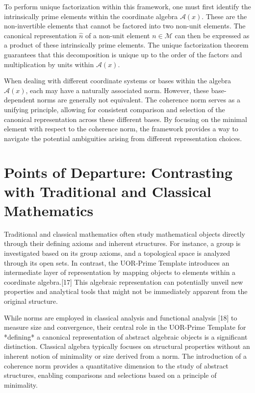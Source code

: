 \documentclass{article}
\begin{document}
To perform unique factorization within this framework, one must first identify the intrinsically prime elements within the coordinate algebra $\mathcal{A}(x)$. These are the non-invertible elements that cannot be factored into two non-unit elements. The canonical representation $\hat{n}$ of a non-unit element $n \in \mathcal{M}$ can then be expressed as a product of these intrinsically prime elements. The unique factorization theorem guarantees that this decomposition is unique up to the order of the factors and multiplication by units within $\mathcal{A}(x)$.

When dealing with different coordinate systems or bases within the algebra $\mathcal{A}(x)$, each may have a naturally associated norm. However, these base-dependent norms are generally not equivalent. The coherence norm serves as a unifying principle, allowing for consistent comparison and selection of the canonical representation across these different bases. By focusing on the minimal element with respect to the coherence norm, the framework provides a way to navigate the potential ambiguities arising from different representation choices.

\section{Points of Departure: Contrasting with Traditional and Classical Mathematics}

Traditional and classical mathematics often study mathematical objects directly through their defining axioms and inherent structures. For instance, a group is investigated based on its group axioms, and a topological space is analyzed through its open sets. In contrast, the UOR-Prime Template introduces an intermediate layer of representation by mapping objects to elements within a coordinate algebra.[17] This algebraic representation can potentially unveil new properties and analytical tools that might not be immediately apparent from the original structure.

While norms are employed in classical analysis and functional analysis [18] to measure size and convergence, their central role in the UOR-Prime Template for *defining* a canonical representation of abstract algebraic objects is a significant distinction. Classical algebra typically focuses on structural properties without an inherent notion of minimality or size derived from a norm. The introduction of a coherence norm provides a quantitative dimension to the study of abstract structures, enabling comparisons and selections based on a principle of minimality.
\end{document}
